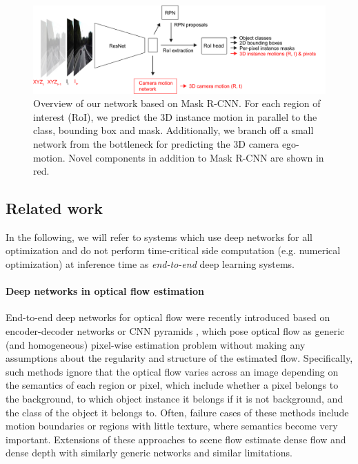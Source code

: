 \begin{figure}[t]
  \centering
  \includegraphics[width=\textwidth]{figures/net_intro}
\caption{
Overview of our network based on Mask R-CNN. For each region of interest (RoI), we predict the 3D instance motion
in parallel to the class, bounding box and mask. Additionally, we branch off a
small network from the bottleneck for predicting the 3D camera ego-motion.
Novel components in addition to Mask R-CNN are shown in red.
}
\label{figure:net_intro}
\end{figure}

\subsection{Related work}

In the following, we will refer to systems which use deep networks for all
optimization and do not perform time-critical side computation (e.g. numerical optimization)
at inference time as \emph{end-to-end} deep learning systems.

\paragraph{Deep networks in optical flow estimation}

End-to-end deep networks for optical flow were recently introduced
based on encoder-decoder networks or CNN pyramids \cite{FlowNet, FlowNet2, SPyNet},
which pose optical flow as generic (and homogeneous) pixel-wise estimation problem without making any assumptions
about the regularity and structure of the estimated flow.
Specifically, such methods ignore that the optical flow varies across an
image depending on the semantics of each region or pixel, which include whether a
pixel belongs to the background, to which object instance it belongs if it is not background,
and the class of the object it belongs to.
Often, failure cases of these methods include motion boundaries or regions with little texture,
where semantics become very important.
Extensions of these approaches to scene flow estimate dense flow and dense depth
with similarly generic networks \cite{SceneFlowDataset} and similar limitations.

